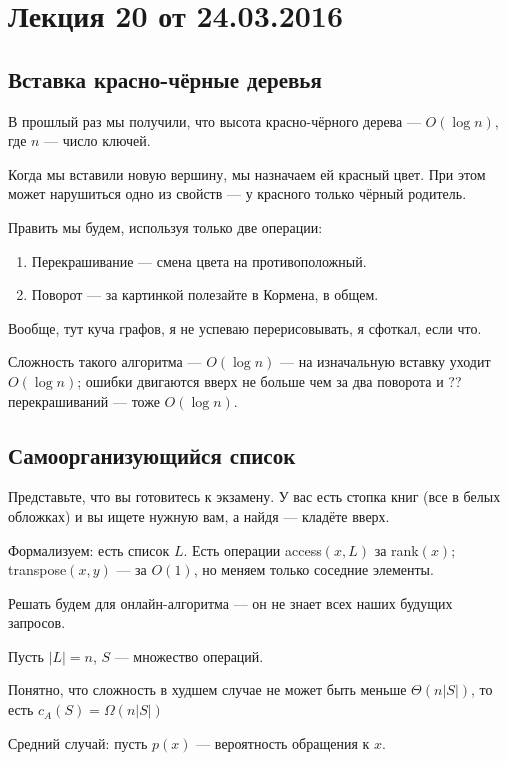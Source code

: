 



\section*{Лекция 20 от 24.03.2016}

\subsection{Вставка красно-чёрные деревья}

В прошлый раз мы получили, что высота красно-чёрного дерева --- $O(\log n)$, где $n$ --- число ключей.

Когда мы вставили новую вершину, мы назначаем ей красный цвет. При этом может нарушиться одно из свойств --- у красного только чёрный родитель.

Править мы будем, используя только две операции:
\begin{enumerate}
    \item Перекрашивание --- смена цвета на противоположный.
    \item Поворот --- за картинкой полезайте в Кормена, в общем.
\end{enumerate}

Вообще, тут куча графов, я не успеваю перерисовывать, я сфоткал, если что.

Сложность такого алгоритма --- $O(\log n)$ --- на изначальную вставку уходит $O(\log n)$; ошибки двигаются вверх не больше чем за два поворота и ?? перекрашиваний --- тоже $O(\log n)$.

\subsection{Самоорганизующийся список}
Представьте, что вы готовитесь к экзамену. У вас есть стопка книг (все в белых обложках) и вы ищете нужную вам, а найдя --- кладёте вверх.

Формализуем: есть список $L$. Есть операции access$(x, L)$ за rank$(x)$; transpose$(x, y)$ --- за $O(1)$, но меняем только соседние элементы.

Решать будем для онлайн-алгоритма --- он не знает всех наших будущих запросов.

Пусть $|L| = n$, $S$ --- множество операций.

Понятно, что сложность в худшем случае не может быть меньше $\Theta(n|S|)$, то есть $c_A(S) = \Omega(n|S|)$

Средний случай: пусть $p(x)$ --- вероятность обращения к $x$.

